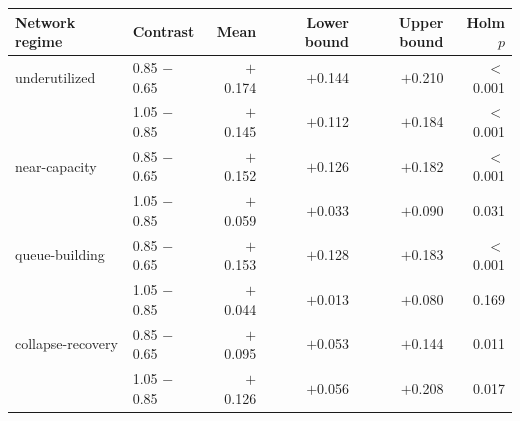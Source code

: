 \begin{tabular}{llrrrr}
\toprule
Network regime & Contrast & Mean & Lower bound & Upper bound & Holm $p$ \\
\midrule
underutilized & 0.85 $-$ 0.65 & $+$0.174 & $+$0.144 & $+$0.210 & $<$0.001 \\
 & 1.05 $-$ 0.85 & $+$0.145 & $+$0.112 & $+$0.184 & $<$0.001 \\
near-capacity & 0.85 $-$ 0.65 & $+$0.152 & $+$0.126 & $+$0.182 & $<$0.001 \\
 & 1.05 $-$ 0.85 & $+$0.059 & $+$0.033 & $+$0.090 & 0.031 \\
queue-building & 0.85 $-$ 0.65 & $+$0.153 & $+$0.128 & $+$0.183 & $<$0.001 \\
 & 1.05 $-$ 0.85 & $+$0.044 & $+$0.013 & $+$0.080 & 0.169 \\
collapse-recovery & 0.85 $-$ 0.65 & $+$0.095 & $+$0.053 & $+$0.144 & 0.011 \\
 & 1.05 $-$ 0.85 & $+$0.126 & $+$0.056 & $+$0.208 & 0.017 \\
\bottomrule
\end{tabular}
